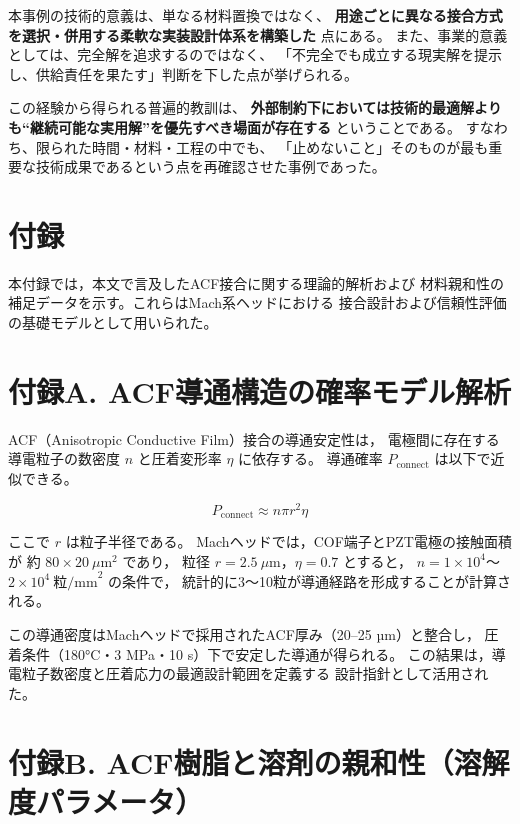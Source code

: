 \documentclass[conference]{IEEEtran}
\begin{document}
本事例の技術的意義は、単なる材料置換ではなく、  
\textbf{用途ごとに異なる接合方式を選択・併用する柔軟な実装設計体系を構築した}  
点にある。  
また、事業的意義としては、完全解を追求するのではなく、  
「不完全でも成立する現実解を提示し、供給責任を果たす」判断を下した点が挙げられる。  

この経験から得られる普遍的教訓は、  
\textbf{外部制約下においては技術的最適解よりも“継続可能な実用解”を優先すべき場面が存在する}  
ということである。  
すなわち、限られた時間・材料・工程の中でも、  
「止めないこと」そのものが最も重要な技術成果であるという点を再確認させた事例であった。

\appendix
\section*{付録}

本付録では，本文で言及したACF接合に関する理論的解析および
材料親和性の補足データを示す。これらはMach系ヘッドにおける
接合設計および信頼性評価の基礎モデルとして用いられた。

\section*{付録A. ACF導通構造の確率モデル解析}

ACF（Anisotropic Conductive Film）接合の導通安定性は，
電極間に存在する導電粒子の数密度 $n$ と圧着変形率 $\eta$ に依存する。
導通確率 $P_{\text{connect}}$ は以下で近似できる。

\begin{equation}
P_{\text{connect}} \approx n \pi r^2 \eta
\end{equation}

ここで $r$ は粒子半径である。
Machヘッドでは，COF端子とPZT電極の接触面積が
約 $80 \times 20~\mu\text{m}^2$ であり，
粒径 $r = 2.5~\mu$m，$\eta = 0.7$ とすると，
$n = 1\times10^4$〜$2\times10^4~\text{粒/mm}^2$ の条件で，
統計的に3〜10粒が導通経路を形成することが計算される。

この導通密度はMachヘッドで採用されたACF厚み（20–25 µm）と整合し，
圧着条件（180°C・3 MPa・10 s）下で安定した導通が得られる。
この結果は，導電粒子数密度と圧着応力の最適設計範囲を定義する
設計指針として活用された。

\section*{付録B. ACF樹脂と溶剤の親和性（溶解度パラメータ）}
\end{document}

